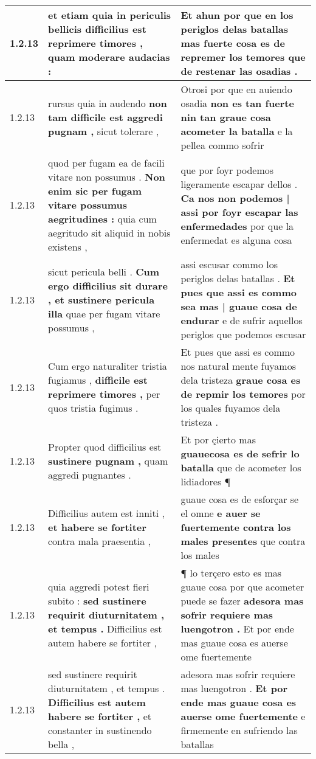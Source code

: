 \begin{tabular}{|p{1cm}|p{6.5cm}|p{6.5cm}|}
1.2.13 & et etiam quia in periculis bellicis \textbf{ difficilius est reprimere timores , } quam moderare audacias : & Et ahun por que en los periglos delas batallas \textbf{ mas fuerte cosa es de repremer los temores } que de restenar las osadias . \\\hline
1.2.13 & rursus quia in audendo \textbf{ non tam difficile est aggredi pugnam , } sicut tolerare , & Otrosi por que en auiendo osadia \textbf{ non es tan fuerte nin tan graue cosa acometer la batalla } e la pellea commo sofrir \\\hline
1.2.13 & quod per fugam ea de facili vitare non possumus . \textbf{ Non enim sic per fugam vitare possumus aegritudines : } quia cum aegritudo sit aliquid in nobis existens , & que por foyr podemos ligeramente escapar dellos . \textbf{ Ca nos non podemos | assi por foyr escapar las enfermedades } por que la enfermedat es alguna cosa \\\hline
1.2.13 & sicut pericula belli . \textbf{ Cum ergo difficilius sit durare , et sustinere pericula illa } quae per fugam vitare possumus , & assi escusar commo los periglos delas batallas . \textbf{ Et pues que assi es commo sea mas | guaue cosa de endurar } e de sufrir aquellos periglos que podemos escusar \\\hline
1.2.13 & Cum ergo naturaliter tristia fugiamus , \textbf{ difficile est reprimere timores , } per quos tristia fugimus . & Et pues que assi es commo nos natural mente fuyamos dela tristeza \textbf{ graue cosa es de repmir los temores } por los quales fuyamos dela tristeza . \\\hline
1.2.13 & Propter quod difficilius est \textbf{ sustinere pugnam , } quam aggredi pugnantes . & Et por çierto mas \textbf{ guauecosa es de sefrir lo batalla } que de acometer los lidiadores ¶ \\\hline
1.2.13 & Difficilius autem est inniti , \textbf{ et habere se fortiter } contra mala praesentia , & guaue cosa es de esforçar se el omne \textbf{ e auer se fuertemente contra los males presentes } que contra los males \\\hline
1.2.13 & quia aggredi potest fieri subito : \textbf{ sed sustinere requirit diuturnitatem , et tempus . } Difficilius est autem habere se fortiter , & ¶ lo terçero esto es mas guaue cosa por que acometer puede se fazer \textbf{ adesora mas sofrir requiere mas luengotron . } Et por ende mas guaue cosa es auerse ome fuertemente \\\hline
1.2.13 & sed sustinere requirit diuturnitatem , et tempus . \textbf{ Difficilius est autem habere se fortiter , } et constanter in sustinendo bella , & adesora mas sofrir requiere mas luengotron . \textbf{ Et por ende mas guaue cosa es auerse ome fuertemente } e firmemente en sufriendo las batallas \\\hline

\end{tabular}

